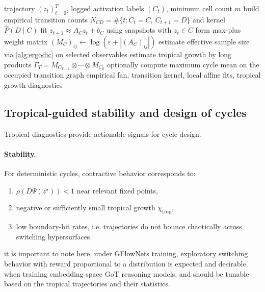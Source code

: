 \documentclass[11pt]{article}
\theoremstyle{definition}
\theoremstyle{plain}
\theoremstyle{remark}
\begin{document}
\begin{algorithm}[t]
\caption{Activation-fan and tropical-cocycle diagnostics for a cyclic subgraph}
\label{alg:tropical-cocycle}
\begin{algorithmic}[1]
\Require trajectory $(z_t)_{t=0}^{T}$, logged activation labels $(C_t)$, minimum cell count $m$
\State build empirical transition counts $N_{CD}=\#\{t: C_t=C,\ C_{t+1}=D\}$ and kernel $\widehat P(D\mid C)$
  \State fit $z_{t+1}\approx A_C z_t+b_C$ using snapshots with $z_t\in C$
  \State form max-plus weight matrix $(M_C)_{ij}\gets \log(\varepsilon + |(A_C)_{ij}|)$
\EndFor
\State estimate effective sample size via \cref{alg:ergodic} on selected observables
\State estimate tropical growth by long products $\Gamma_T=M_{C_{T-1}}\otimes\cdots\otimes M_{C_0}$
\State optionally compute maximum cycle mean on the occupied transition graph
\State \Return empirical fan, transition kernel, local affine fits, tropical growth diagnostics
\end{algorithmic}
\end{algorithm}

\subsection{Tropical-guided stability and design of cycles}
Tropical diagnostics provide actionable signals for cycle design.

\paragraph{Stability.}
For deterministic cycles, contractive behavior corresponds to:
\begin{enumerate}[leftmargin=2em]
\item $\rho(D\Psi(z^\star))<1$ near relevant fixed points,
\item negative or sufficiently small tropical growth $\chi_{\mathrm{trop}}$,
\item low boundary-hit rates, i.e. trajectories do not bounce chaotically across switching hypersurfaces.
\end{enumerate}

it is important to note here, under GFlowNets training, exploratory switching behavior with reward proportional to a distribution is expected and desirable when training embedding space GoT reasoning models, and should be tunable based on the tropical trajectories and their statistics. 
\end{document}
